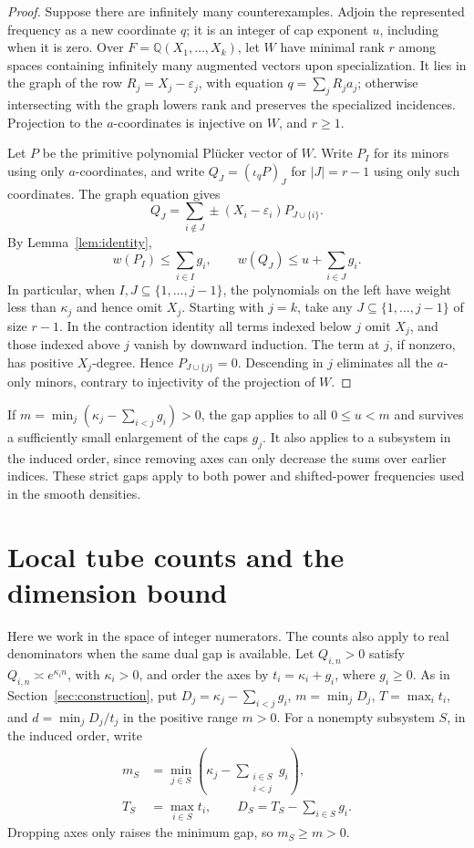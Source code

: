 \documentclass[11pt,a4paper,reqno]{amsart}
\theoremstyle{definition}
\theoremstyle{remark}
\numberwithin{equation}{section}
\begin{document}
\begin{proof}
Suppose there are infinitely many counterexamples. Adjoin the
represented frequency as a new coordinate \(q\); it is an
integer of cap exponent \(u\), including when it is zero.
Over \(F=\mathbb Q(X_1,\ldots,X_k)\), let \(W\) have minimal
rank \(r\) among spaces containing infinitely many augmented
vectors upon specialization. It lies in the graph of the row
\(R_j=X_j-\varepsilon_j\), with equation \(q=\sum_j R_j a_j\);
otherwise intersecting with the graph lowers rank and
preserves the specialized incidences. Projection to the
\(a\)-coordinates is injective on \(W\), and \(r\ge1\).

Let \(P\) be the primitive polynomial Pl\"ucker vector of \(W\).
Write \(P_I\) for its minors using only \(a\)-coordinates,
and write \(Q_J=(\iota_qP)_J\) for \(|J|=r-1\) using only
such coordinates. The graph equation gives
\[
        Q_J=\sum_{i\notin J}\pm(X_i-\varepsilon_i)P_{J\cup\{i\}} .
\]
By Lemma~\ref{lem:identity},
\[
      w(P_I)\le\sum_{i\in I}g_i,\qquad
      w(Q_J)\le u+\sum_{i\in J}g_i .
\]
In particular, when \(I,J\subseteq\{1,\ldots,j-1\}\), the
polynomials on the left have weight less than \(\kappa_j\)
and hence omit \(X_j\). Starting with \(j=k\), take any
\(J\subseteq\{1,\ldots,j-1\}\) of size \(r-1\). In the
contraction identity all terms indexed below \(j\) omit
\(X_j\), and those indexed above \(j\) vanish by downward
induction. The term at \(j\), if nonzero, has positive
\(X_j\)-degree. Hence \(P_{J\cup\{j\}}=0\). Descending in \(j\)
eliminates all the \(a\)-only minors, contrary to injectivity
of the projection of \(W\).
\end{proof}

If \(m=\min_j(\kappa_j-\sum_{i<j}g_i)>0\), the gap applies to
all \(0\le u<m\) and survives a sufficiently small enlargement
of the caps \(g_j\). It also applies to a subsystem in the
induced order, since removing axes can only decrease the sums
over earlier indices. These strict gaps apply to both power
and shifted-power frequencies used in the smooth densities.
\section{Local tube counts and the dimension bound}\label{app:counts}

Here we work in the space of integer numerators. The counts also apply to real denominators when the same dual gap is available. Let \(Q_{i,n}>0\) satisfy \(Q_{i,n}\asymp e^{\kappa_i n}\), with \(\kappa_i>0\), and order the axes by \(t_i=\kappa_i+g_i\), where \(g_i\ge0\). As in Section~\ref{sec:construction}, put \(D_j=\kappa_j-\sum_{i<j}g_i\), \(m=\min_jD_j\), \(T=\max_i t_i\), and \(d=\min_j D_j/t_j\) in the positive range \(m>0\). For a nonempty subsystem \(S\), in the induced order, write
\[
 \begin{split}
 m_S&=\min_{j\in S}\left(\kappa_j-\sum_{\substack{i\in S\\i<j}}g_i\right),\\
 T_S&=\max_{i\in S}t_i,\qquad D_S=T_S-\sum_{i\in S}g_i .
 \end{split}
\]
Dropping axes only raises the minimum gap, so \(m_S\ge m>0\).
\end{document}

